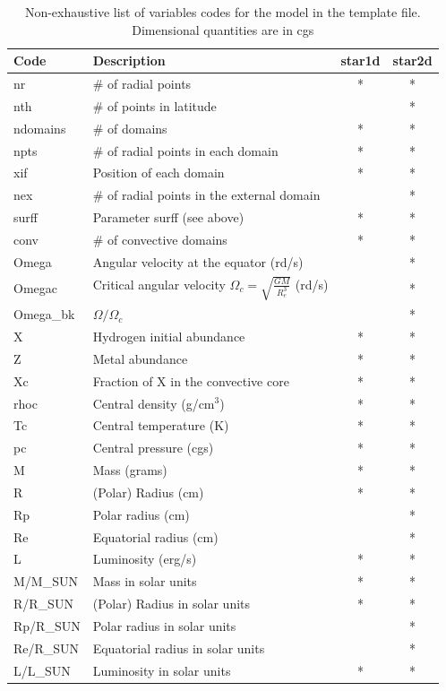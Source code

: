 \begin{longtable}{|l|p{8cm}|c|c|}
\caption{Non-exhaustive list of variables codes for the model in the template
file. Dimensional quantities are in cgs}\\
\hline
\bf Code&\bf Description&\bf star1d&\bf star2d\\
\hline\hline
nr&\# of radial points&*&*\\
\hline
nth&\# of points in latitude&&*\\
\hline
ndomains&\# of domains&*&*\\
\hline
npts&\# of radial points in each domain&*&*\\
\hline
xif&Position of each domain&*&*\\
\hline
nex&\# of radial points in the external domain&&*\\
\hline
surff&Parameter surff (see above)&*&*\\
\hline
conv&\# of convective domains&*&*\\
\hline
Omega&Angular velocity at the equator (rd/s)&&*\\
\hline
Omegac&Critical angular velocity $\Omega_c=\sqrt{\frac{GM}{R_e^3}}$ (rd/s)&&*\\
\hline
Omega\_bk& $\Omega/\Omega_c$   &&*\\
\hline
X&Hydrogen initial abundance&*&*\\
\hline
Z&Metal abundance&*&*\\
\hline
Xc&Fraction of X in the convective core&*&*\\
\hline
rhoc&Central density (g/cm$^3$)&*&*\\
\hline
Tc&Central temperature (K)&*&*\\
\hline
pc&Central pressure (cgs)&*&*\\
\hline
M&Mass (grams)&*&*\\
\hline
R&(Polar) Radius (cm)&*&*\\
\hline
Rp&Polar radius (cm)&&*\\
\hline
Re&Equatorial radius (cm)&&*\\
\hline
L&Luminosity (erg/s)&*&*\\
\hline
M/M\_SUN&Mass in solar units&*&*\\
\hline
R/R\_SUN&(Polar) Radius in solar units&*&*\\
\hline
Rp/R\_SUN&Polar radius in solar units&&*\\
\hline
Re/R\_SUN&Equatorial radius in solar units&&*\\
\hline
L/L\_SUN&Luminosity in solar units&*&*\\

\end{longtable}
